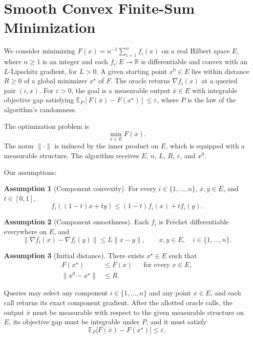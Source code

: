 \documentclass[10pt]{article}
\theoremstyle{definition}
\newtheorem{assumption}{Assumption}
\begin{document}
\section*{Smooth Convex Finite-Sum Minimization}
We consider minimizing $F(x)=n^{-1}\sum_{i=1}^{n}f_i(x)$ on a real Hilbert space $E$, where $n\geq1$ is an integer and each $f_i:E\to\mathbb{R}$ is differentiable and convex with an $L$-Lipschitz gradient, for $L>0$. A given starting point $x^0\in E$ lies within distance $R\geq0$ of a global minimizer $x^\star$ of $F$. The oracle returns $\nabla f_i(x)$ at a queried pair $(i,x)$. For $\varepsilon>0$, the goal is a measurable output $\bar{x}\in E$ with integrable objective gap satisfying $\mathbb{E}_{P}[F(\bar{x})-F(x^\star)]\leq\varepsilon$, where $P$ is the law of the algorithm's randomness.

The optimization problem is
\[
\min_{x\in E} F(x).
\]
The norm $\|\cdot\|$ is induced by the inner product on $E$, which is equipped with a measurable structure. The algorithm receives $E$, $n$, $L$, $R$, $\varepsilon$, and $x^0$.

Our assumptions:
\begin{assumption}[Component convexity]
For every $i\in\{1,\ldots,n\}$, $x,y\in E$, and $t\in[0,1]$,
\[
f_i((1-t)x+ty)\leq (1-t)f_i(x)+t f_i(y).
\]
\end{assumption}

\begin{assumption}[Component smoothness]
Each $f_i$ is Fr\'echet differentiable everywhere on $E$, and
\[
\|\nabla f_i(x)-\nabla f_i(y)\|\leq L\|x-y\|,
\qquad x,y\in E,\quad i\in\{1,\ldots,n\}.
\]
\end{assumption}

\begin{assumption}[Initial distance]
There exists $x^\star\in E$ such that
\[
\begin{aligned}
F(x^\star)&\leq F(x) &&\text{for every }x\in E,\\
\|x^0-x^\star\|&\leq R.
\end{aligned}
\]
\end{assumption}

Queries may select any component $i\in\{1,\ldots,n\}$ and any point $x\in E$, and each call returns its exact component gradient. After the allotted oracle calls, the output $\bar{x}$ must be measurable with respect to the given measurable structure on $E$, its objective gap must be integrable under $P$, and it must satisfy
\[
\mathbb{E}_{P}\bigl[F(\bar{x})-F(x^\star)\bigr]\leq\varepsilon.
\]
\end{document}
